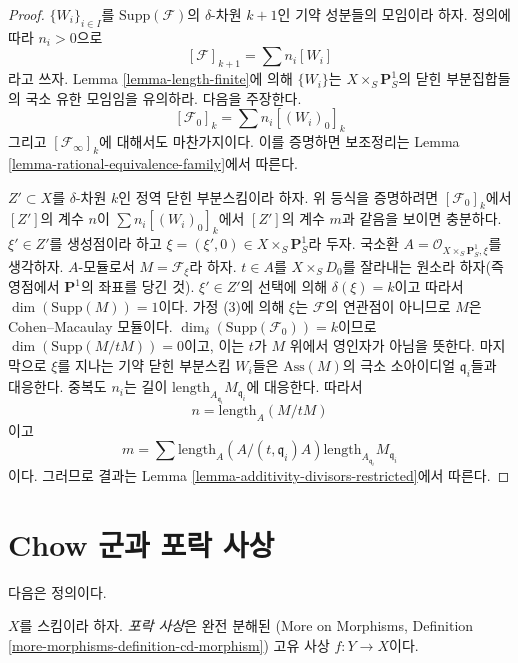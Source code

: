 \begin{proof}
$\{W_i\}_{i \in I}$를 $\text{Supp}(\mathcal{F})$의
$\delta$-차원 $k + 1$인 기약 성분들의 모임이라 하자. 정의에 따라
$n_i > 0$으로
$$
[\mathcal{F}]_{k + 1} = \sum n_i[W_i]
$$
라고 쓰자. Lemma \ref{lemma-length-finite}에 의해 $\{W_i\}$는
$X \times_S \mathbf{P}^1_S$의 닫힌 부분집합들의 국소 유한 모임임을
유의하라. 다음을 주장한다.
$$
[\mathcal{F}_0]_k = \sum n_i[(W_i)_0]_k
$$
그리고 $[\mathcal{F}_\infty]_k$에 대해서도 마찬가지이다. 이를 증명하면
보조정리는 Lemma \ref{lemma-rational-equivalence-family}에서 따른다.

\medskip\noindent
$Z' \subset X$를 $\delta$-차원 $k$인 정역 닫힌 부분스킴이라 하자.
위 등식을 증명하려면 $[\mathcal{F}_0]_k$에서 $[Z']$의 계수 $n$이
$\sum n_i[(W_i)_0]_k$에서 $[Z']$의 계수 $m$과 같음을 보이면 충분하다.
$\xi' \in Z'$를 생성점이라 하고
$\xi = (\xi', 0) \in  X \times_S \mathbf{P}^1_S$라 두자. 국소환
$A = \mathcal{O}_{X \times_S \mathbf{P}^1_S, \xi}$를 생각하자.
$A$-모듈로서 $M = \mathcal{F}_\xi$라 하자. $t \in A$를
$X \times_S D_0$를 잘라내는 원소라 하자(즉 영점에서
$\mathbf{P}^1$의 좌표를 당긴 것). $\xi' \in Z'$의 선택에 의해
$\delta(\xi) = k$이고 따라서 $\dim(\text{Supp}(M)) = 1$이다. 가정
(3)에 의해 $\xi$는 $\mathcal{F}$의 연관점이 아니므로 $M$은
Cohen--Macaulay 모듈이다.
$\dim_\delta(\text{Supp}(\mathcal{F}_0)) = k$이므로
$\dim(\text{Supp}(M/tM)) = 0$이고, 이는 $t$가 $M$ 위에서 영인자가
아님을 뜻한다. 마지막으로 $\xi$를 지나는 기약 닫힌 부분스킴
$W_i$들은 $\text{Ass}(M)$의 극소 소아이디얼 $\mathfrak q_i$들과
대응한다. 중복도 $n_i$는 길이
$\text{length}_{A_{\mathfrak q_i}}M_{\mathfrak q_i}$에 대응한다.
따라서
$$
n = \text{length}_A(M/tM)
$$
이고
$$
m = \sum
\text{length}_A(A/(t, \mathfrak q_i)A)
\text{length}_{A_{\mathfrak q_i}}M_{\mathfrak q_i}
$$
이다. 그러므로 결과는 Lemma
\ref{lemma-additivity-divisors-restricted}에서 따른다.
\end{proof}







\section{Chow 군과 포락 사상}
\label{section-envelopes}

\noindent
다음은 정의이다.

\begin{definition}
\label{definition-envelope}
\begin{reference}
\cite[Definition 18.3]{F}
\end{reference}
$X$를 스킴이라 하자. {\it 포락 사상}은 완전 분해된
(More on Morphisms, Definition \ref{more-morphisms-definition-cd-morphism})
고유 사상 $f : Y \to X$이다.
\end{definition}

